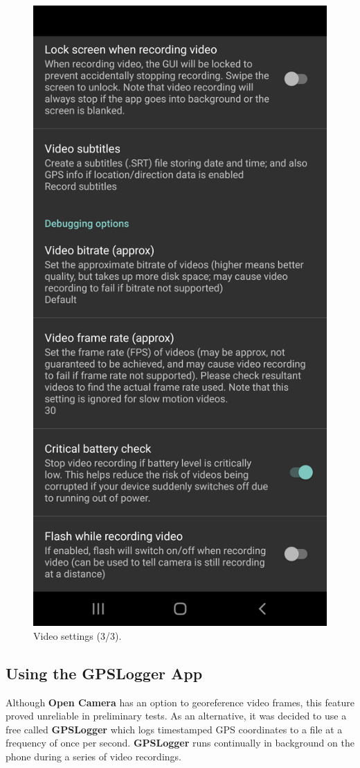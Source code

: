 \documentclass[12pt,letterpaper,english,bibliography=totocnumbered, abstract=on]{scrartcl}
\begin{document}
\begin{figure}[H]
	\centering
	\includegraphics[width=0.7\linewidth]{images/videosettings3}
	\caption{Video settings (3/3).}
	\label{fig:videosettings3}
\end{figure}

\subsection{Using the GPSLogger App}

Although \textbf{Open Camera} has an option to georeference video frames, this feature proved unreliable in preliminary tests. As an alternative, it was decided to use a free called \textbf{GPSLogger} which logs timestamped GPS coordinates to a file at a frequency of once per second. \textbf{GPSLogger} runs continually in background on the phone during a series of video recordings.
\end{document}
